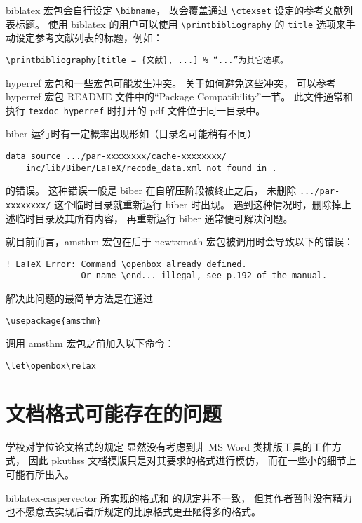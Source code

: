 biblatex 宏包会自行设定 \verb|\bibname|，
故会覆盖通过 \verb|\ctexset| 设定的参考文献列表标题。
使用 biblatex 的用户可以使用 \verb|\printbibliography| 的
\verb|title| 选项来手动设定参考文献列表的标题，例如：
\begin{Verbatim}
\printbibliography[title = {文献}, ...] % “...”为其它选项。
\end{Verbatim}

hyperref 宏包和一些宏包可能发生冲突。
关于如何避免这些冲突，
可以参考 hyperref 宏包 README 文件中的“Package Compatibility”一节。
此文件通常和执行 \verb|texdoc hyperref|
时打开的 pdf 文件位于同一目录中。

biber 运行时有一定概率出现形如（目录名可能稍有不同）
\begin{Verbatim}
data source .../par-xxxxxxxx/cache-xxxxxxxx/
	inc/lib/Biber/LaTeX/recode_data.xml not found in .
\end{Verbatim}
的错误。
这种错误一般是 biber 在自解压阶段被终止之后，
未删除 \verb|.../par-xxxxxxxx/| 这个临时目录就重新运行 biber 时出现。
遇到这种情况时，删除掉上述临时目录及其所有内容，
再重新运行 biber 通常便可解决问题。

就目前而言，amsthm 宏包在后于 newtxmath
宏包被调用时会导致以下的错误：
\begin{Verbatim}
! LaTeX Error: Command \openbox already defined.
               Or name \end... illegal, see p.192 of the manual.
\end{Verbatim}
解决此问题的最简单方法是在通过
\begin{Verbatim}
\usepackage{amsthm}
\end{Verbatim}
调用 amsthm 宏包之前加入以下命令：
\begin{Verbatim}
\let\openbox\relax
\end{Verbatim}

\section{文档格式可能存在的问题}

学校对学位论文格式的规定%
显然没有考虑到非 MS Word 类排版工具的工作方式，
因此 pkuthss 文档模版只是对其要求的格式进行模仿，
而在一些小的细节上可能有所出入。

biblatex-caspervector 所实现的格式和
\parencite{pku-thesisstyle} 的规定并不一致，
但其作者暂时没有精力也不愿意去实现后者所规定的比原格式更丑陋得多的格式。

